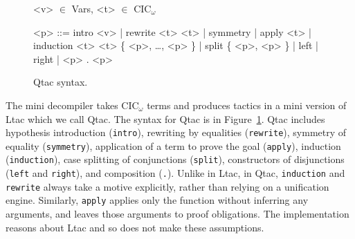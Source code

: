 \begin{figure}
\small
\begin{grammar}
<v> $\in$ Vars, <t> $\in$ CIC$_{\omega}$

<p> ::= intro <v> |  rewrite <t> <t> | symmetry | apply <t> | \\
induction <t> <t> \{ <p>, \ldots, <p> \} | split \{ <p>, <p> \} | left | right | <p> . <p>
\end{grammar}
\vspace{-0.3cm}
\caption{Qtac syntax.}
\label{fig:ltacsyntax1}
\end{figure}

The mini decompiler takes CIC$_{\omega}$ terms and produces tactics in a mini version of Ltac which we call Qtac.
The syntax for Qtac is in Figure~\ref{fig:ltacsyntax1}.
Qtac includes hypothesis introduction (\lstinline{intro}),
rewriting by equalities (\lstinline{rewrite}), symmetry of equality (\lstinline{symmetry}),
application of a term to prove the goal (\lstinline{apply}), induction (\lstinline{induction}),
case splitting of conjunctions (\lstinline{split}),
constructors of disjunctions (\lstinline{left} and \lstinline{right}), and
composition (\lstinline{.}).
Unlike in Ltac, in Qtac, \lstinline{induction} and \lstinline{rewrite} always take a motive explicitly, rather than relying on a unification engine.
Similarly, \lstinline{apply} applies only the function without inferring any arguments, and leaves those arguments to proof obligations.
The implementation reasons about Ltac and so does not make these assumptions.

